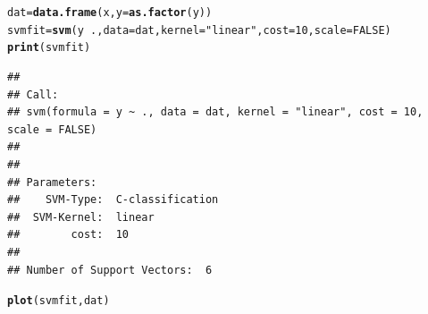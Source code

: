 \documentclass[aspectratio=169]{beamer}\usepackage[]{graphicx}\usepackage[]{xcolor}
\makeatletter
\newcommand{\hlnum}[1]{\textcolor[rgb]{0.686,0.059,0.569}{#1}}%
\newcommand{\hlstr}[1]{\textcolor[rgb]{0.192,0.494,0.8}{#1}}%
\newcommand{\hlopt}[1]{\textcolor[rgb]{0,0,0}{#1}}%
\newcommand{\hlstd}[1]{\textcolor[rgb]{0.345,0.345,0.345}{#1}}%
\newcommand{\hlkwb}[1]{\textcolor[rgb]{0.69,0.353,0.396}{#1}}%
\newcommand{\hlkwc}[1]{\textcolor[rgb]{0.333,0.667,0.333}{#1}}%
\newcommand{\hlkwd}[1]{\textcolor[rgb]{0.737,0.353,0.396}{\textbf{#1}}}%
\newenvironment{kframe}{%
 \def\at@end@of@kframe{}%
 \ifinner\ifhmode%
  \def\at@end@of@kframe{\end{minipage}}%
  \begin{minipage}{\columnwidth}%
 \fi\fi%
 \def\FrameCommand##1{\hskip\@totalleftmargin \hskip-\fboxsep
 \colorbox{shadecolor}{##1}\hskip-\fboxsep
     \hskip-\linewidth \hskip-\@totalleftmargin \hskip\columnwidth}%
 \MakeFramed {\advance\hsize-\width
   \@totalleftmargin\z@ \linewidth\hsize
   \@setminipage}}%
 {\par\unskip\endMakeFramed%
 \at@end@of@kframe}
\newenvironment{knitrout}{}{} %
\makeatother
\begin{document}
\begin{frame}[fragile]
\begin{knitrout}
\color{fgcolor}\begin{kframe}
\begin{alltt}
\hlstd{dat} \hlkwb{=} \hlkwd{data.frame}\hlstd{(x,} \hlkwc{y} \hlstd{=} \hlkwd{as.factor}\hlstd{(y))}
\hlstd{svmfit} \hlkwb{=} \hlkwd{svm}\hlstd{(y} \hlopt{~} \hlstd{.,} \hlkwc{data} \hlstd{= dat,} \hlkwc{kernel} \hlstd{=} \hlstr{"linear"}\hlstd{,} \hlkwc{cost} \hlstd{=} \hlnum{10}\hlstd{,} \hlkwc{scale} \hlstd{=} \hlnum{FALSE}\hlstd{)}
\hlkwd{print}\hlstd{(svmfit)}
\end{alltt}
\begin{verbatim}
## 
## Call:
## svm(formula = y ~ ., data = dat, kernel = "linear", cost = 10, scale = FALSE)
## 
## 
## Parameters:
##    SVM-Type:  C-classification 
##  SVM-Kernel:  linear 
##        cost:  10 
## 
## Number of Support Vectors:  6
\end{verbatim}
\begin{alltt}
\hlkwd{plot}\hlstd{(svmfit, dat)}
\end{alltt}
\end{kframe}
\end{knitrout}
\end{frame}

\end{document}
